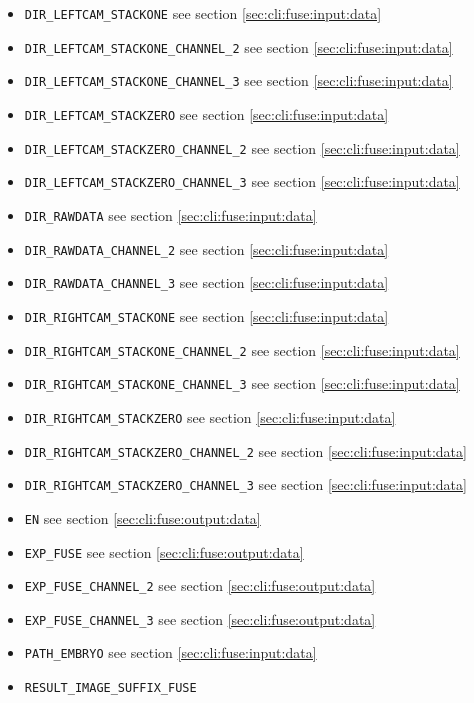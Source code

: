 \begin{itemize}
\itemsep -1ex
\item \texttt{DIR\_LEFTCAM\_STACKONE} see section \ref{sec:cli:fuse:input:data}
\item \texttt{DIR\_LEFTCAM\_STACKONE\_CHANNEL\_2} see section \ref{sec:cli:fuse:input:data}
\item \texttt{DIR\_LEFTCAM\_STACKONE\_CHANNEL\_3} see section \ref{sec:cli:fuse:input:data}
\item \texttt{DIR\_LEFTCAM\_STACKZERO} see section \ref{sec:cli:fuse:input:data}
\item \texttt{DIR\_LEFTCAM\_STACKZERO\_CHANNEL\_2} see section \ref{sec:cli:fuse:input:data}
\item \texttt{DIR\_LEFTCAM\_STACKZERO\_CHANNEL\_3} see section \ref{sec:cli:fuse:input:data}
\item \texttt{DIR\_RAWDATA} see section \ref{sec:cli:fuse:input:data}
\item \texttt{DIR\_RAWDATA\_CHANNEL\_2} see section \ref{sec:cli:fuse:input:data}
\item \texttt{DIR\_RAWDATA\_CHANNEL\_3} see section \ref{sec:cli:fuse:input:data}
\item \texttt{DIR\_RIGHTCAM\_STACKONE} see section \ref{sec:cli:fuse:input:data}
\item \texttt{DIR\_RIGHTCAM\_STACKONE\_CHANNEL\_2} see section \ref{sec:cli:fuse:input:data}
\item \texttt{DIR\_RIGHTCAM\_STACKONE\_CHANNEL\_3} see section \ref{sec:cli:fuse:input:data}
\item \texttt{DIR\_RIGHTCAM\_STACKZERO} see section \ref{sec:cli:fuse:input:data}
\item \texttt{DIR\_RIGHTCAM\_STACKZERO\_CHANNEL\_2} see section \ref{sec:cli:fuse:input:data}
\item \texttt{DIR\_RIGHTCAM\_STACKZERO\_CHANNEL\_3} see section \ref{sec:cli:fuse:input:data}
\item \texttt{EN} see section \ref{sec:cli:fuse:output:data}
\item \texttt{EXP\_FUSE} see section \ref{sec:cli:fuse:output:data}
\item \texttt{EXP\_FUSE\_CHANNEL\_2} see section \ref{sec:cli:fuse:output:data}
\item \texttt{EXP\_FUSE\_CHANNEL\_3} see section \ref{sec:cli:fuse:output:data}
\item \texttt{PATH\_EMBRYO} see section \ref{sec:cli:fuse:input:data}
\item \texttt{RESULT\_IMAGE\_SUFFIX\_FUSE}

\end{itemize}
